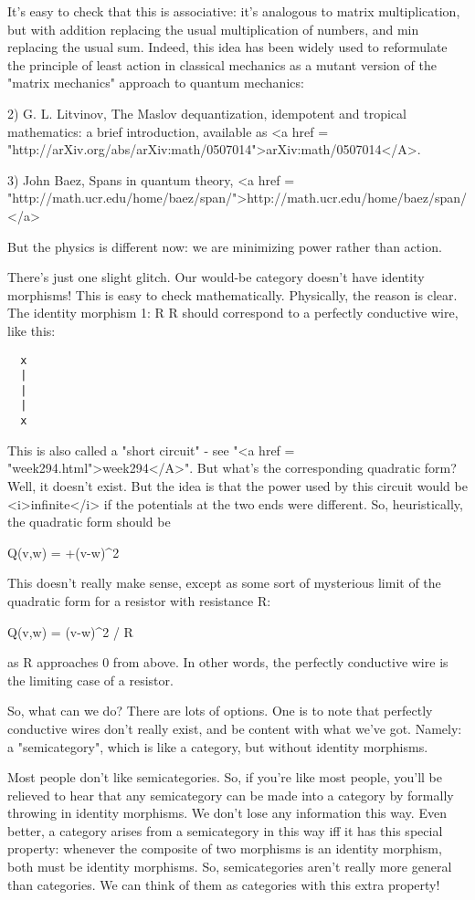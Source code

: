 It's easy to check that this is associative: it's analogous to matrix
multiplication, but with addition replacing the usual multiplication
of numbers, and min replacing the usual sum.  Indeed, this idea has
been widely used to reformulate the principle of least action in
classical mechanics as a mutant version of the "matrix mechanics"
approach to quantum mechanics:

2) G. L. Litvinov, The Maslov dequantization, idempotent and tropical
mathematics: a brief introduction, available as <a href = "http://arXiv.org/abs/arXiv:math/0507014">arXiv:math/0507014</A>.

3) John Baez, Spans in quantum theory, <a href = "http://math.ucr.edu/home/baez/span/">http://math.ucr.edu/home/baez/span/</a>

But the physics is different now: we are minimizing power rather than
action.

There's just one slight glitch.  Our would-be category doesn't have
identity morphisms!  This is easy to check mathematically.  Physically, 
the reason is clear.  The identity morphism 1: R \to  R should correspond
to a perfectly conductive wire, like this:

\begin{verbatim}
  x  
  |  
  |  
  |  
  x  
\end{verbatim}
    

This is also called a "short circuit" - see "<a href =
"week294.html">week294</A>".  But what's the corresponding
quadratic form?  Well, it doesn't exist.  But the idea is that the
power used by this circuit would be <i>infinite</i> if the potentials at
the two ends were different.  So, heuristically, the quadratic form
should be

Q(v,w) = +\infty (v-w)^{2}

This doesn't really make sense, except as some sort of mysterious 
limit of the quadratic form for a resistor with resistance R:

Q(v,w) = (v-w)^{2} / R

as R approaches 0 from above.  In other words, the perfectly
conductive wire is the limiting case of a resistor.

So, what can we do?  There are lots of options.  One is to note that
perfectly conductive wires don't really exist, and be content with
what we've got.  Namely: a "semicategory", which is like a
category, but without identity morphisms.

Most people don't like semicategories.  So, if you're like most
people, you'll be relieved to hear that any semicategory can be made
into a category by formally throwing in identity morphisms.  We don't
lose any information this way.  Even better, a category arises from a
semicategory in this way iff it has this special property: whenever the
composite of two morphisms is an identity morphism, both must be
identity morphisms.  So, semicategories aren't really more general
than categories.  We can think of them as categories with this extra
property!

